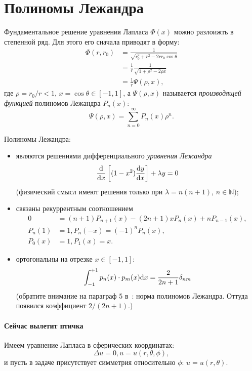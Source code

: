 \documentclass[12pt]{report}
\begin{document}
\section{Полиномы Лежандра}
Фундаментальное решение уравнения Лапласа $\Phi(x)$ можно разлоижть в степенной ряд. Для этого его сначала приводят в форму:~\cite[стр.~672]{Tikhonov}
\begin{align*}
\Phi(r,r_0) &=  \frac{1}{\sqrt{r_0^2 + r^2 -2rr_0\cos\theta}} \tag{теорема косинусов}\\
&= \frac1r\frac{1}{\sqrt{1 + \rho^2 -2\rho x}} \\
&= \frac1r\Psi(\rho, x),
\end{align*}
где $\rho = r_0/r < 1$, $x = \cos\theta\in [-1, 1]$, а $\Psi(\rho, x)$ называется \emph{производящей функцией} полиномов Лежандра $P_n(x)$:
\[
\Psi(\rho, x) = \sum_{n=0}^\infty P_n(x)\rho^n.
\]

Полиномы Лежандра:
\begin{itemize}
	\item являются решениями дифференциального \emph{уравнения Лежандра}
	\[
	\frac{\mathrm d}{\mathrm d x}\left[(1-x^2)\frac{\mathrm d y}{\mathrm d x}\right] + \lambda y = 0
	\]
	(физический смысл имеют решения только при $\lambda=n(n+1)$, $n\in\mathbb{N}$);
	\item связаны рекуррентным соотношением
	\begin{align*}
	0 &= (n+1)P_{n+1}(x) - (2n+1)xP_n(x) + nP_{n-1}(x), \\
	P_n(1) &= 1, P_n(-x) = (-1)^nP_n(x), \\
	P_0(x) &= 1, P_1(x) = x.
	\end{align*}
	\item ортогональны на отрезке $x \in [-1, 1]$:
	\[
	\int_{-1}^{+1} p_n(x)\cdot p_m(x)\mathrm d x = \frac{2}{2n+1}\delta_{nm}
	\]
	(обратите внимание на параграф 5 в~\cite{Tikhonov:Legandre}: норма полиномов Лежандра. Оттуда появился коэффициент $2/(2n+1)$.)
\end{itemize}
\paragraph{Сейчас вылетит птичка}
Имеем уравнение Лапласа в сферических координатах:
\[
\Delta u = 0, u = u(r,\theta,\phi),
\]
и пусть в задаче присутствует симметрия относительно $\phi$: $u = u(r,\theta)$.
\end{document}
